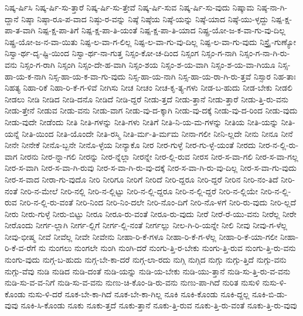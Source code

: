 {ನಿಷ್ಕ-ರ್ಷಿಸಿ
ನಿಷ್ಕ-ರ್ಷಿ-ಸು-ತ್ತಾರೆ
ನಿಷ್ಕ-ರ್ಷಿ-ಸು-ತ್ತೇವೆ
ನಿಷ್ಕ-ರ್ಷಿ-ಸುವ
ನಿಷ್ಕ-ರ್ಷಿ-ಸು-ವುದು
ನಿಷ್ಕಾಮ
ನಿಷ್ಠ-ನಾ-ಗಿ-ದ್ದಾನೆ
ನಿಷ್ಠಾ
ನಿಷ್ಠಾ-ರೂ-ಪ-ವಾದ
ನಿಷ್ಠು-ರ-ವನ್ನು
ನಿಷ್ಠೆ
ನಿಷ್ಠೆಯ
ನಿಷ್ಠೆ-ಯನ್ನು
ನಿಷ್ಠೆ-ಯಾದ
ನಿಷ್ಠೆ-ಯು-ಳ್ಳದ್ದು
ನಿಷ್ಪ-ಕ್ಷ-ಪಾ-ತ-ವಾಗಿ
ನಿಷ್ಪ-ಕ್ಷ-ಪಾ-ತಿಗೆ
ನಿಷ್ಪ-ಕ್ಷ-ಪಾ-ತಿ-ಯಂತೆ
ನಿಷ್ಪ-ಕ್ಷ-ಪಾ-ತಿ-ಯಾದ
ನಿಷ್ಪ್ರ-ಯೋ-ಜ-ಕ-ವಾ-ಗು-ವು-ದಿಲ್ಲ
ನಿಷ್ಪ್ರ-ಯೋ-ಜ-ನ-ವಾ-ಯಿತು
ನಿಷ್ಫ-ಲ-ವಾ-ಗ-ಲಿಲ್ಲ
ನಿಷ್ಫ-ಲ-ವಾ-ಗು-ವು-ದಿಲ್ಲ
ನಿಷ್ಫ-ಲ-ವಾ-ಗು-ವುದು
ನಿಸ್ತ್ರೈ-ಗುಣ್ಯೋ
ನಿಸ್ವಾ-ರ್ಥ-ದೃ-ಷ್ಟಿ-ಯಿಂದ
ನಿಸ್ವಾ-ರ್ಥ-ನಾ-ಗುತ್ತ
ನಿಸ್ಸಂ-ಕೋ-ಚ-ದಿಂದ
ನಿಸ್ಸಂಗ
ನಿಸ್ಸಂ-ಗ-ನಾಗಿ
ನಿಸ್ಸಂ-ಗ-ನಾ-ಗಿ-ರು-ವನು
ನಿಸ್ಸಂ-ಗ-ರಾಗಿ
ನಿಸ್ಸಂಗಿ
ನಿಸ್ಸಂ-ದೇ-ಹ-ವಾಗಿ
ನಿಸ್ಸಂ-ಶಯ
ನಿಸ್ಸಂ-ಶ-ಯ-ವಾಗಿ
ನಿಸ್ಸಂ-ಶ-ಯ-ವಾ-ಗಿಯೂ
ನಿಸ್ಸ-ಹಾ-ಯ-ಕ-ನಾಗಿ
ನಿಸ್ಸ-ಹಾ-ಯ-ಕ-ವಾ-ಗು-ವುದು
ನಿಸ್ಸ-ಹಾ-ಯ-ನಾಗಿ
ನಿಸ್ಸ-ಹಾ-ಯ-ರಾ-ಗಿ-ರು-ತ್ತವೆ
ನಿಸ್ಸಾರ
ನಿಹ-ತಾಃ
ನಿಹತ್ಯ
ನಿಹಾ-ರಿಕೆ
ನಿಹಾ-ರಿ-ಕೆ-ಗ-ಳಿವೆ
ನೀಗಿಸು
ನೀಚ
ನೀಚಂ
ನೀಚ-ಕೃ-ತ್ಯ-ಗಳು
ನೀಡ-ಬ-ಹುದು
ನೀಡ-ಬೇಕು
ನೀಡಲಿ
ನೀಡಲು
ನೀಡಿ
ನೀಡಿದ
ನೀಡಿ-ದನೊ
ನೀಡಿದೆ
ನೀಡಿ-ದ್ದರೆ
ನೀಡು-ತ್ತದೆ
ನೀಡು-ತ್ತಾನೆ
ನೀಡು-ತ್ತಾರೆ
ನೀಡು-ತ್ತಿ-ರು-ವನು
ನೀಡು-ತ್ತೇನೆ
ನೀಡುವ
ನೀಡು-ವನು
ನೀಡು-ವಾಗ
ನೀಡು-ವು-ದ-ಕ್ಕಾಗಿ
ನೀಡು-ವು-ದಕ್ಕೆ
ನೀಡು-ವು-ದ-ರಿಂದ
ನೀಡು-ವುದು
ನೀಡು-ವುದೇ
ನೀಡೆಂದು
ನೀತಿ
ನೀತಿ-ಗಳನ್ನು
ನೀತಿ-ಗಳು
ನೀತಿಗೆ
ನೀತಿ-ನಿ-ಯ-ಮ-ಗಳನ್ನು
ನೀತಿಯ
ನೀತಿ-ಯನ್ನು
ನೀತಿ-ಯನ್ನೆ
ನೀತಿ-ಯಿಂದ
ನೀತಿ-ಯೊಂದೇ
ನೀತಿ-ರಸ್ಮಿ
ನೀತಿ-ರ್ಮ-ತಿ-ರ್ಮಮ
ನೀನಾ-ಗಲೀ
ನೀನಿ-ಲ್ಲದೇ
ನೀನು
ನೀನೂ
ನೀನೆ
ನೀನೇ
ನೀನೇಕೆ
ನೀನೊ-ಬ್ಬನೇ
ನೀನೊ-ಳ್ಳೆಯ
ನೀನ್ಯಾಕೊ
ನೀರ
ನೀರ-ಗುಳ್ಳೆ
ನೀರ-ಗು-ಳ್ಳೆ-ಯಂತೆ
ನೀರದು
ನೀರ-ನ-ಲ್ಲಿ-ರು-ವಾಗ
ನೀರನು
ನೀರ-ನ್ನಾ-ಗಲಿ
ನೀರನ್ನು
ನೀರ-ನ್ನೆಲ್ಲಾ
ನೀರನ್ನೇ
ನೀರ-ಲ್ಲಿ-ರುವ
ನೀರಸ
ನೀರ-ಸ-ವಾ-ಗಲಿ
ನೀರ-ಸ-ವಾ-ಗಲ್ಲ
ನೀರ-ಸ-ವಾಗಿ
ನೀರ-ಸ-ವಾ-ಗಿ-ರುವು
ನೀರ-ಸ-ವಾ-ಗಿ-ರು-ವು-ದಕ್ಕೆ
ನೀರ-ಸ-ವಾ-ಗಿ-ರು-ವು-ದಿಲ್ಲ
ನೀರ-ಸ-ವಾ-ಗು-ವುದು
ನೀರ-ಸ-ವಾದ
ನೀರಾ-ಗು-ವುದೊ
ನೀರಿ
ನೀರಿಗೂ
ನೀರಿಗೆ
ನೀರಿದೆ
ನೀರಿ-ದ್ದರೂ
ನೀರಿ-ದ್ದರೆ
ನೀರಿನ
ನೀರಿ-ನಂ-ತಿದೆ
ನೀರಿ-ನಂತೆ
ನೀರಿ-ನ-ಮೇಲೆ
ನೀರಿ-ನಲ್ಲಿ
ನೀರಿ-ನ-ಲ್ಲಿಟ್ಟು
ನೀರಿ-ನ-ಲ್ಲಿ-ದ್ದರೂ
ನೀರಿ-ನ-ಲ್ಲಿ-ದ್ದರೆ
ನೀರಿ-ನ-ಲ್ಲಿಯೇ
ನೀರಿ-ನ-ಲ್ಲಿ-ರುವ
ನೀರಿ-ನ-ಲ್ಲಿ-ರು-ವಂತೆ
ನೀರಿ-ನಿಂದ
ನೀರಿ-ನಿಂ-ದಲೇ
ನೀರಿ-ನೊಂ-ದಿಗೆ
ನೀರಿ-ನೊ-ಳಗೆ
ನೀರಿ-ರು-ವುದು
ನೀರಿ-ಲ್ಲದೆ
ನೀರು
ನೀರು-ಗುಳ್ಳೆ
ನೀರು-ಬಿಟ್ಟು
ನೀರೂ
ನೀರೂ-ರು-ವಂತೆ
ನೀರೂ-ರು-ವುದು
ನೀರೆ
ನೀರೆ-ರೆ-ಯು-ವನು
ನೀರೆಲ್ಲ
ನೀರೇ
ನೀರೊಂದು
ನೀರ್ಗ-ಲ್ಲಾಗಿ
ನೀರ್ಗ-ಲ್ಲಿಗೆ
ನೀರ್ಗ-ಲ್ಲಿ-ನಂತೆ
ನೀರ್ಗಲ್ಲು
ನೀಲ-ಗಿ-ರಿ-ಯನ್ನೇ
ನೀಲಿ
ನೀವು
ನೀವು-ಗ-ಳೆಲ್ಲ
ನೀವು-ಭೀಷ್ಮ
ನೀವೆ
ನೀವೆಲ್ಲ
ನೀವೇ
ನೀವೇನು
ನೀಹಾ-ರಿ-ಕೆ-ಗಳೂ
ನೀಹಾ-ರಿ-ಕೆ-ಗ-ಳೆಲ್ಲ
ನೀಹಾ-ರಿ-ಕೆ-ಯಾ-ಗಲೀ
ನೀಹಾ-ರಿ-ಕೆ-ವ-ರೆಗೆ
ನು
ನುಂಗಲು
ನುಂಗಲೇ
ನುಂಗಿ
ನುಂಗಿ-ದರೆ
ನುಂಗು-ತ್ತಿ-ರ-ಬೇಕು
ನುಂಗು-ತ್ತಿ-ರುವ
ನುಂಗು-ತ್ತಿ-ರು-ವನು
ನುಂಗು-ವುದು
ನುಗ್ಗ-ಬ-ಹುದು
ನುಗ್ಗ-ಬೇ-ಕಾ-ದರೆ
ನುಗ್ಗ-ಲಾ-ರದು
ನುಗ್ಗಿ
ನುಗ್ಗಿದ
ನುಗ್ಗು
ನುಗ್ಗು-ತ್ತಿದೆ
ನುಗ್ಗು-ವನು
ನುಗ್ಗು-ವೆವು
ನುಡಿ
ನುಡಿದ
ನುಡಿ-ದಂತೆ
ನುಡಿ-ಯನ್ನು
ನುಡಿ-ಯ-ಬೇಕು
ನುಡಿ-ಯು-ತ್ತಾನೆ
ನುಡಿ-ಸು-ತ್ತಿ-ರು-ವ-ವನು
ನುಡಿ-ಸು-ವ-ವ-ನಿಗೆ
ನುಡಿ-ಸು-ವ-ವನು
ನುಣು-ಚಿ-ಕೊಂ-ಡಿ-ರು-ವನು
ನುಣು-ಪಾ-ಗಿದೆ
ನುರಿತ
ನುಸುಳಿ
ನುಸು-ಳಿ-ಕೊಂಡು
ನುಸು-ಳಿ-ದರೆ
ನೂಕ-ಬೇ-ಕಾ-ಗಿದೆ
ನೂಕ-ಬೇ-ಕಾ-ಗಿಲ್ಲ
ನೂಕಿ
ನೂಕಿ-ಕೊಂಡು
ನೂಕಿ-ದ್ದಲ್ಲ
ನೂಕಿ-ಬಿ-ಡು-ವುವು
ನೂಕಿ-ಸಿ-ಕೊಂಡು
ನೂಕು
ನೂಕು-ತ್ತದೆ
ನೂಕು-ತ್ತಾನೆ
ನೂಕು-ತ್ತಿ-ರುವ
ನೂಕು-ತ್ತಿ-ರು-ವಂತೆ
ನೂಕು-ತ್ತಿ-ರು-ವುವು
}

